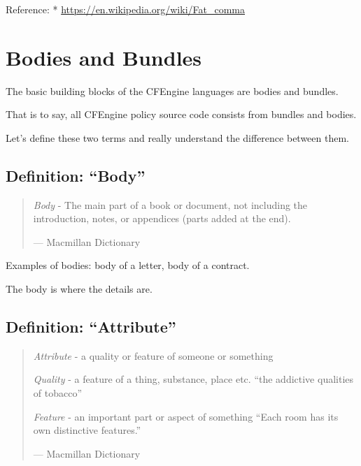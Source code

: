 Reference:
* \href{https://en.wikipedia.org/wiki/Fat_comma}{https://en.wikipedia.org/wiki/Fat\_comma}





\section{Bodies and Bundles}

The basic building blocks of the CFEngine languages are bodies and bundles.

That is to say, all CFEngine policy source code consists from bundles
and bodies.

Let's define these two terms and really understand the difference
between them.





\subsection{Definition: ``Body''}

\begin{quotation}
\emph{Body}
- The main part of a book or document, not including the introduction,
notes, or appendices (parts added at the end).

--- Macmillan Dictionary
\end{quotation}

Examples of bodies: body of a letter, body of a contract.

The body is where the details are.





\subsection{Definition: ``Attribute''}

\begin{quotation}
\emph{Attribute}
- a quality or feature of someone or something

\emph{Quality}
- a feature of a thing, substance, place etc.
``the addictive qualities of tobacco''

\emph{Feature}
- an important part or aspect of something
``Each room has its own distinctive features.''

--- Macmillan Dictionary
\end{quotation}





